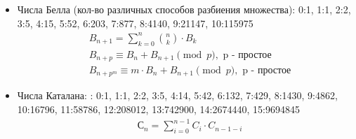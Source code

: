 \documentclass{article}
\begin{document}
\begin{itemize}
\begin{longtable}[c]{llllllll}
\end{longtable}
\item Числа Белла (кол-во различных способов разбиения множества): 0:1, 1:1, 2:2, 3:5, 4:15, 5:52, 6:203, 7:877, 8:4140, 9:21147, 10:115975\\
\begin{equation}
  \begin{split}
    &B_{n + 1} = \sum\limits_{k = 0}^n\binom{n}{k} \cdot B_k\\
    &B_{n + p} \equiv B_n + B_{n + 1}\pmod{p}, \text{ p - простое}\\
    &B_{n + p^m} \equiv m \cdot B_n + B_{n + 1}\pmod{p}, \text{ p - простое}
  \end{split}
\end{equation}

\item Числа Каталана: : 0:1, 1:1, 2:2, 3:5, 4:14, 5:42, 6:132, 7:429, 8:1430, 9:4862, 10:16796, 11:58786, 12:208012, 13:742900,
14:2674440, 15:9694845
\begin{equation}
  \begin{split}
    &С_{n} = \sum\limits_{i = 0}^{n - 1}C_i \cdot C_{n - 1 - i}\\
  \end{split}
\end{equation}

\end{itemize}
\end{document}
